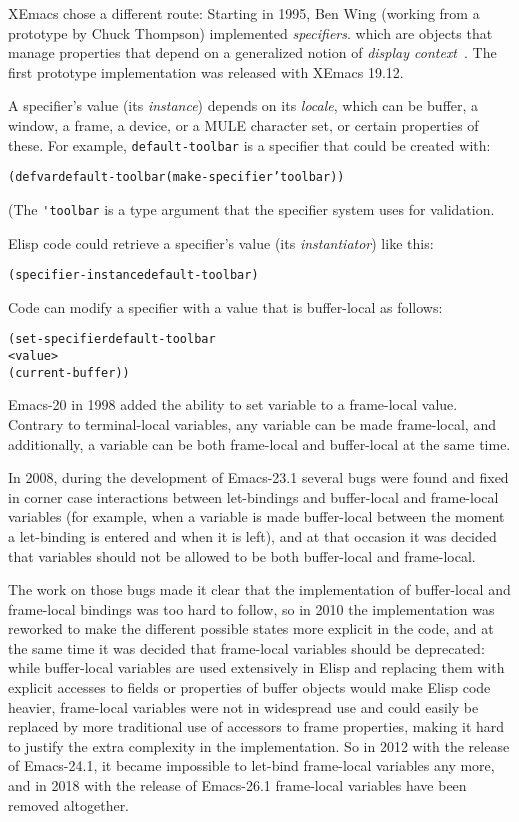 \documentclass[format=acmsmall, review=false, screen=true]{acmart}
\newcommand \Elisp {Elisp}
\begin{document}
XEmacs chose a different route: Starting in 1995, Ben Wing (working
from a prototype by Chuck Thompson) implemented
\textit{specifiers}. which are objects that manage properties that
depend on a generalized notion of \textit{display
  context}~\cite{XEmacsLispRef1998}.  The first prototype
implementation was released with XEmacs 19.12.

A specifier's value (its \textit{instance}) depends on its
\textit{locale}, which can be buffer, a window, a frame, a device, or a MULE
character set, or certain properties of these.  For example,
\texttt{default-toolbar} is a specifier that could be created with:
%
\begin{alltt}
(defvar default-toolbar (make-specifier 'toolbar))
\end{alltt}
%
(The \verb|'toolbar| is a type argument that the specifier system uses
for validation.

\Elisp{} code could retrieve a specifier's value (its
\textit{instantiator}) like this:
%
\begin{alltt}
(specifier-instance default-toolbar)
\end{alltt}
%
Code can modify a specifier with a value that is buffer-local as
follows:
%
\begin{alltt}
(set-specifier default-toolbar
               <value>
               (current-buffer))
\end{alltt}
%
Emacs-20 in 1998 added the ability to set variable to a frame-local
value.  Contrary to terminal-local variables, any variable can be made
frame-local, and additionally, a variable can be both frame-local and
buffer-local at the same time.


In 2008, during the development of Emacs-23.1 several bugs were found and
fixed in corner case interactions between let-bindings and buffer-local and
frame-local variables (for example, when a variable is made buffer-local
between the moment a let-binding is entered and when it is left), and at
that occasion it was decided that variables should not be allowed to be both
buffer-local and frame-local.

The work on those bugs made it clear that the implementation of buffer-local
and frame-local bindings was too hard to follow, so in 2010 the
implementation was reworked to make the different possible states more
explicit in the code, and at the same time it was decided that frame-local
variables should be deprecated: while buffer-local variables are used
extensively in \Elisp{} and replacing them with explicit accesses to fields
or properties of buffer objects would make \Elisp{} code heavier,
frame-local variables were not in widespread use and could easily be
replaced by more traditional use of accessors to frame properties, making it
hard to justify the extra complexity in the implementation.  So in 2012 with
the release of Emacs-24.1, it became impossible to let-bind frame-local
variables any more, and in 2018 with the release of Emacs-26.1 frame-local
variables have been removed altogether.
\end{document}
